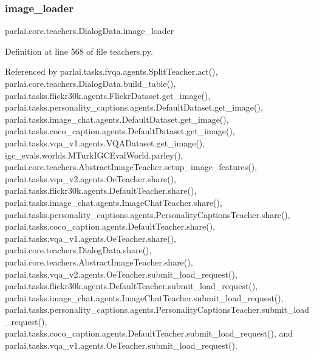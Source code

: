 \mbox{\label{classparlai_1_1core_1_1teachers_1_1DialogData_aa44f9307c376a1e4bf4697a289db688b}} 
\subsubsection{\texorpdfstring{image\+\_\+loader}{image\_loader}}
{\footnotesize\ttfamily parlai.\+core.\+teachers.\+Dialog\+Data.\+image\+\_\+loader}



Definition at line 568 of file teachers.\+py.



Referenced by parlai.\+tasks.\+fvqa.\+agents.\+Split\+Teacher.\+act(), parlai.\+core.\+teachers.\+Dialog\+Data.\+build\+\_\+table(), parlai.\+tasks.\+flickr30k.\+agents.\+Flickr\+Dataset.\+get\+\_\+image(), parlai.\+tasks.\+personality\+\_\+captions.\+agents.\+Default\+Dataset.\+get\+\_\+image(), parlai.\+tasks.\+image\+\_\+chat.\+agents.\+Default\+Dataset.\+get\+\_\+image(), parlai.\+tasks.\+coco\+\_\+caption.\+agents.\+Default\+Dataset.\+get\+\_\+image(), parlai.\+tasks.\+vqa\+\_\+v1.\+agents.\+V\+Q\+A\+Dataset.\+get\+\_\+image(), igc\+\_\+evals.\+worlds.\+M\+Turk\+I\+G\+C\+Eval\+World.\+parley(), parlai.\+core.\+teachers.\+Abstract\+Image\+Teacher.\+setup\+\_\+image\+\_\+features(), parlai.\+tasks.\+vqa\+\_\+v2.\+agents.\+Oe\+Teacher.\+share(), parlai.\+tasks.\+flickr30k.\+agents.\+Default\+Teacher.\+share(), parlai.\+tasks.\+image\+\_\+chat.\+agents.\+Image\+Chat\+Teacher.\+share(), parlai.\+tasks.\+personality\+\_\+captions.\+agents.\+Personality\+Captions\+Teacher.\+share(), parlai.\+tasks.\+coco\+\_\+caption.\+agents.\+Default\+Teacher.\+share(), parlai.\+tasks.\+vqa\+\_\+v1.\+agents.\+Oe\+Teacher.\+share(), parlai.\+core.\+teachers.\+Dialog\+Data.\+share(), parlai.\+core.\+teachers.\+Abstract\+Image\+Teacher.\+share(), parlai.\+tasks.\+vqa\+\_\+v2.\+agents.\+Oe\+Teacher.\+submit\+\_\+load\+\_\+request(), parlai.\+tasks.\+flickr30k.\+agents.\+Default\+Teacher.\+submit\+\_\+load\+\_\+request(), parlai.\+tasks.\+image\+\_\+chat.\+agents.\+Image\+Chat\+Teacher.\+submit\+\_\+load\+\_\+request(), parlai.\+tasks.\+personality\+\_\+captions.\+agents.\+Personality\+Captions\+Teacher.\+submit\+\_\+load\+\_\+request(), parlai.\+tasks.\+coco\+\_\+caption.\+agents.\+Default\+Teacher.\+submit\+\_\+load\+\_\+request(), and parlai.\+tasks.\+vqa\+\_\+v1.\+agents.\+Oe\+Teacher.\+submit\+\_\+load\+\_\+request().

